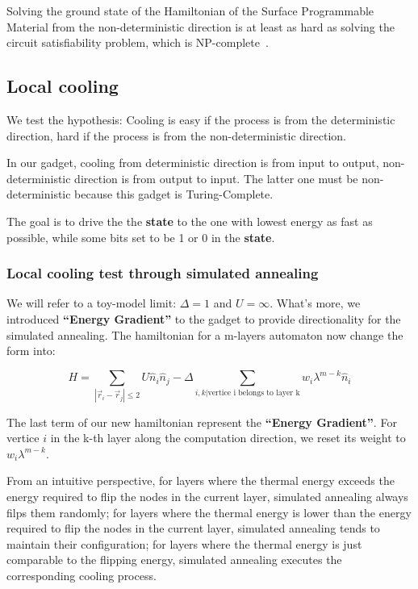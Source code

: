 \documentclass[twocolumn,superscriptaddress,english,showpacs,longbibliography]{revtex4-2}
\begin{document}
Solving the ground state of the Hamiltonian of the Surface Programmable Material from the non-deterministic direction is at least as hard as solving the circuit satisfiability problem, which is NP-complete~\cite{Moore2011}.

\subsection{Local cooling}\label{local-cooling}

We test the hypothesis: Cooling is easy if the process is from the
deterministic direction, hard if the process is from the
non-deterministic direction.

In our gadget, cooling from deterministic direction is from input to
output, non-deterministic direction is from output to input. The latter
one must be non-deterministic because this gadget is Turing-Complete.

The goal is to drive the the \textbf{state} to the one with lowest energy as fast as possible, while some bits set to be 1 or 0 in the \textbf{state}.

\subsubsection{Local cooling test through simulated
annealing}\label{local-cooling-test-through-simulated-annealing}

We will refer to a toy-model limit: $\Delta = 1$ and $U = \infty$.
What's more, we introduced \textbf{``Energy Gradient''} to the gadget to
provide directionality for the simulated annealing. The hamiltonian for
a m-layers automaton now change the form into:

\[
H = \sum_{|\vec r_i - \vec r_j|\leq 2} U \hat n_i \hat n_j  - \Delta \sum_{i,k|\text{vertice i belongs to layer k}} w_i \lambda^{m-k} \hat n_i
\]

The last term of our new hamiltonian represent the \textbf{``Energy
Gradient''}. For vertice $i$ in the k-th layer along the computation
direction, we reset its weight to $w_i\lambda^{m-k}$.

From an intuitive perspective, for layers where the thermal energy
exceeds the energy required to flip the nodes in the current layer,
simulated annealing always filps them randomly; for layers where the
thermal energy is lower than the energy required to flip the nodes in
the current layer, simulated annealing tends to maintain their
configuration; for layers where the thermal energy is just comparable to
the flipping energy, simulated annealing executes the corresponding
cooling process.
\end{document}
